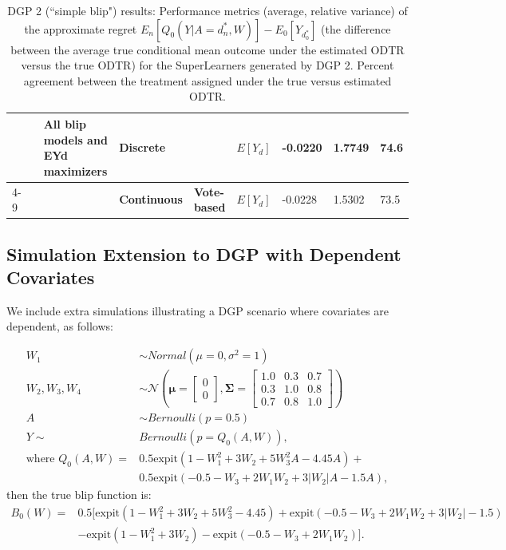 \documentclass[a4paper,12pt]{article}
\begin{document}
\begin{table}[]
{\begin{tabular}{|l|l|l|l|l|l|l|l|l|}
                                &                                      & \multirow{2}{*}{\textbf{All blip models and EYd maximizers}} & \multicolumn{2}{l|}{\textbf{Discrete}}                                      & \textbf{$E[Y_d]$} & -0.0220              & 1.7749                        & 74.6              \\ \cline{4-9} 
                                &                                      &                                                              & \textbf{Continuous}                  & \textbf{Vote-based}                  & \textbf{$E[Y_d]$} & -0.0228              & 1.5302                        & 73.5              \\ \hline
\end{tabular}
}
\caption{DGP 2 (``simple blip") results: Performance metrics (average, relative variance) of the approximate regret $E_n [Q_0(Y|A= d_n^*,W)]-E_0 [Y_{d_0^*}]$ (the difference between the average true conditional mean outcome under the estimated ODTR versus the true ODTR) for the SuperLearners generated by DGP 2. Percent agreement between the treatment assigned under the true versus estimated ODTR.}
\label{table2}
\end{table}


\pagebreak
\subsection{Simulation Extension to DGP with Dependent Covariates}

We include extra simulations illustrating a DGP scenario where covariates are dependent, as follows:

\begin{align*}
W_1 &\sim Normal(\mu=0,\sigma^2=1) \\
W_2,W_3,W_4 &\sim \mathcal{N}\left(\mathbold{\mu} = \begin{bmatrix}
0\\
0
\end{bmatrix}, \mathbold{\Sigma} = \begin{bmatrix}
1.0 & 0.3 & 0.7\\
0.3 & 1.0 & 0.8\\
0.7 & 0.8 & 1.0
\end{bmatrix}\right) \\
A &\sim Bernoulli(p=0.5) \\
Y \sim & Bernoulli(p=Q_0(A,W)),\\
\text{where } Q_0(A,W) =& 0.5\textrm{expit} (1-W_1^2  + 3W_2  + 5W_3^2 A - 4.45A)+ \\
& 0.5\textrm{expit} (-0.5- W_3  + 2W_1 W_2  + 3|W_2|A - 1.5A),
\end{align*}
then the true blip function is:
\begin{align*}
    B_0 (W)= & 0.5[\textrm{expit} (1-W_1^2  + 3W_2  + 5W_3^2  - 4.45)+\textrm{expit} (-0.5- W_3  + 2W_1 W_2  + 3|W_2|  - 1.5)\\
& - \textrm{expit} (1-W_1^2  + 3W_2 )-\textrm{expit} (-0.5- W_3  + 2W_1 W_2 )].
\end{align*}
\end{document}
